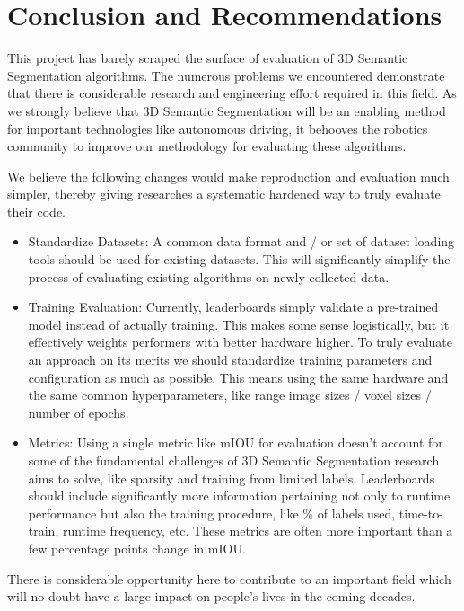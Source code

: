 \section{Conclusion and Recommendations}
\label{chap:conclusion}

This project has barely scraped the surface of evaluation of 3D Semantic Segmentation algorithms. The numerous problems we encountered demonstrate that there is considerable research and engineering effort required in this field. As we strongly believe that 3D Semantic Segmentation will be an enabling method for important technologies like autonomous driving, it behooves the robotics community to improve our methodology for evaluating these algorithms.

We believe the following changes would make reproduction and evaluation much simpler, thereby giving researches a systematic hardened way to truly evaluate their code.

\begin{itemize}
  \item Standardize Datasets: A common data format and / or set of dataset loading tools should be used for existing datasets. This will significantly simplify the process of evaluating existing algorithms on newly collected data.
  \item Training Evaluation: Currently, leaderboards simply validate a pre-trained model instead of actually training. This makes some sense logistically, but it effectively weights performers with better hardware higher. To truly evaluate an approach on its merits we should standardize training parameters and configuration as much as possible. This means using the same hardware and the same common hyperparameters, like range image sizes / voxel sizes / number of epochs.
  \item Metrics: Using a single metric like mIOU for evaluation doesn't account for some of the fundamental challenges of 3D Semantic Segmentation research aims to solve, like sparsity and training from limited labels. Leaderboards should include significantly more information pertaining not only to runtime performance but also the training procedure, like \% of labels used, time-to-train, runtime frequency, etc. These metrics are often more important than a few percentage points change in mIOU.
\end{itemize}

There is considerable opportunity here to contribute to an important field which will no doubt have a large impact on people's lives in the coming decades.

\newpage
